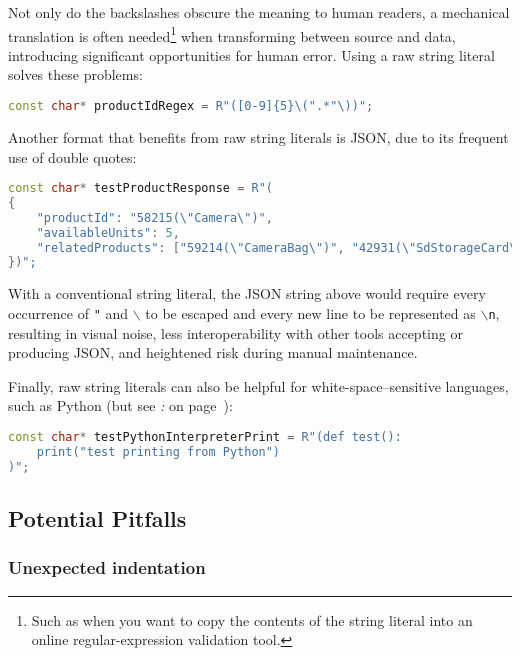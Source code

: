 \noindent Not only do the backslashes obscure the meaning to human readers, a
mechanical translation is often needed{\cprotect\footnote{Such as when
you want to copy the contents of the string literal into an online
  regular-expression validation tool.}} when transforming between source
and data, introducing significant opportunities for human error. Using a
raw string literal solves these problems:

\begin{lstlisting}[language=C++]
const char* productIdRegex = R"([0-9]{5}\(".*"\))";
\end{lstlisting}
    
\noindent Another format that benefits from raw string literals is JSON, due to
its frequent use of double quotes:

\begin{lstlisting}[language=C++]
const char* testProductResponse = R"(
{
    "productId": "58215(\"Camera\")",
    "availableUnits": 5,
    "relatedProducts": ["59214(\"CameraBag\")", "42931(\"SdStorageCard\")"]
})";
\end{lstlisting}
    
\noindent With a conventional string literal, the JSON string above would require
every occurrence of \texttt{"} and \texttt{$\backslash$} to be escaped
and every new line to be represented as \texttt{$\backslash$n}, resulting
in visual noise, less interoperability with other tools accepting or
producing JSON, and heightened risk during manual maintenance.

Finally, raw string literals can also be helpful for
white-space--sensitive languages, such as Python (but see \textit{: } on page~\pageref{encoding-of-newlines-and-whitespace}):

\begin{lstlisting}[language=C++]
const char* testPythonInterpreterPrint = R"(def test():
    print("test printing from Python")
)";
\end{lstlisting}
    

\subsection[Potential Pitfalls]{Potential Pitfalls}\label{potential-pitfalls-rawstringliteral}

\subsubsection[Unexpected indentation]{Unexpected indentation}\label{unexpected-indentation}

